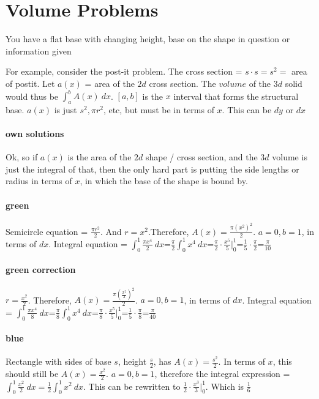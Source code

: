 \documentclass[letterpaper, 12pt]{article}
\begin{document}
\section{Volume Problems}
You have a flat base with changing height, base on the shape in question or information given \par
For example, consider the post-it problem. The cross section = $s\cdot s=s^2=$ area of postit. Let $a(x)$ = area of the $2d$ cross section. The $volume$ of the $3d$ solid would thus be $\int_{a}^{b} A(x)\:dx$. $[a,b]$ is the $x$ interval that forms the structural base. $a(x)$ is just $s^2, \pi r^2$, etc, but must be in terms of $x$. This can be $dy$ or $dx$ \paragraph{own solutions}
Ok, so if $a(x)$ is the area of the $2d$ shape / cross section, and the $3d$ volume is just the integral of that, then the only hard part is putting the side lengths or radius in terms of $x$, in which the base of the shape is bound by. \paragraph{green}
Semicircle equation = $\frac{\pi r^2}{2}$.
And $r = x^2$.Therefore, $A(x)=\frac{\pi (x^2)^2}{2}$. $a=0, b=1$, in terms of $dx$. Integral equation = $\int_{0}^{1}\frac{\pi x^4}{2}\:dx$=$\frac{\pi}{2}\int_{0}^{1}x^4\:dx$=$\frac{\pi}{2}\cdot\frac{x^5}{5}\big|_{0}^{1}$=$\frac{1}{5}\cdot\frac{\pi}{2}$=$\frac{\pi}{10}$ \paragraph{green correction}
$r= \frac{x^2}{2}$. Therefore, $A(x)=\frac{\pi (\frac{x^2}{2})^2}{2}$. $a=0, b=1$, in terms of $dx$. Integral equation = $\int_{0}^{1}\frac{\pi x^4}{8}\:dx$=$\frac{\pi}{8}\int_{0}^{1}x^4\:dx$=$\frac{\pi}{8}\cdot\frac{x^5}{5}\big|_{0}^{1}$=$\frac{1}{5}\cdot\frac{\pi}{8}$=$\frac{\pi}{40}$ \paragraph{blue}
Rectangle with sides of base $s$, height $\frac{s}{2}$, has $A(x)=\frac{s^2}{2}$. In terms of $x$, this should still be $A(x)=\frac{x^2}{2}$. $a=0, b=1$, therefore the integral expression = $\int_{0}^{1}\frac{x^2}{2}\:dx=\frac{1}{2}\int_{0}^{1}x^2\:dx$. This can be rewritten to $\frac{1}{2}\cdot\frac{x^3}{3}\big|_{0}^{1}$. Which is $\frac{1}{6}$
\end{document}
